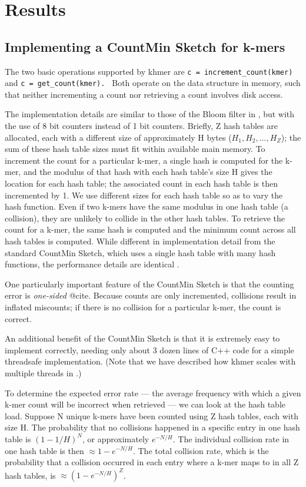 \documentclass[10pt]{article}
\begin{document}
\section*{Results}

\subsection*{Implementing a CountMin Sketch for k-mers}

The two basic operations supported by khmer are {\tt c =
  increment\_count(kmer) } and {\tt c = get\_count(kmer). }
Both operate on the data structure in memory, such that neither
incrementing a count nor retrieving a count involves disk
access.

The implementation details are similar to those of the Bloom filter in
\cite{Pell2012}, but with the use of 8 bit counters instead of 1 bit
counters.  Briefly, Z hash tables are allocated, each with a different
size of approximately H bytes ($H_1, H_2, ..., H_Z$); the sum of these hash table sizes must
fit within available main memory.  To increment the count for a
particular k-mer, a single hash is computed for the k-mer, and the
modulus of that hash with each hash table's size H gives the location
for each hash table; the associated count in each hash table is then
incremented by 1.  We use different sizes for each hash table so as
to vary the hash function.
Even if two k-mers have the same modulus in one hash table (a collision),
they are unlikely to collide in the other hash tables.
To retrieve the count for a k-mer, the same hash is
computed and the minimum count across all hash tables is computed.
While different in implementation detail from the standard CountMin Sketch,
which uses a single hash table with many hash
functions, the performance details are identical \cite{Pell2012}.

One particularly important feature of the CountMin Sketch is that the
counting error is {\em one-sided} @cite.  Because counts are only
incremented, collisions result in inflated miscounts; if there is
no collision for a particular k-mer, the count is correct.

An additional benefit of the CountMin Sketch is that it is extremely
easy to implement correctly, needing only about 3 dozen lines of C++
code for a simple threadsafe implementation.  (Note that we have
described how khmer scales with multiple threads in \cite{McDonald2013}.)

To determine the expected error rate --- the average frequency
with which a given k-mer count will be incorrect when retrieved --- we
can look at the hash table load. Suppose N unique k-mers have been
counted using Z hash tables, each with size H.  The probability that
no collisions happened in a specific entry in one hash table is
$(1-1/H)^{N}$, or approximately $e^{-N/H}$. The individual
collision rate in one hash table is then $\approx 1-e^{-N/H}$. The total collision
rate, which is the probability that a collision occurred in each entry
where a k-mer maps to in all Z hash tables, is $\approx (1-e^{-N/H})^{Z}$.
\end{document}
